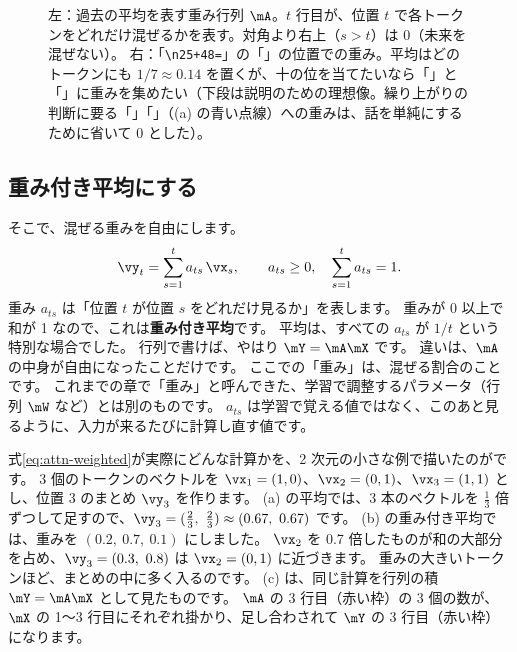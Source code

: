 \begin{figure}[tbp]
\caption{左：過去の平均を表す重み行列 $\mA$。$t$ 行目が、位置 $t$ で各トークンをどれだけ混ぜるかを表す。対角より右上（$s>t$）は 0（未来を混ぜない）。
右：「\texttt{\textbackslash n25+48=}」の「\code{=}」の位置での重み。平均はどのトークンにも $1/7\approx0.14$ を置くが、十の位を当てたいなら「」と「」に重みを集めたい（下段は説明のための理想像。繰り上がりの判断に要る「」「」（(a) の青い点線）への重みは、話を単純にするために省いて 0 とした）。}
\label{fig:attn-avg}
\end{figure}

\subsection*{重み付き平均にする}

そこで、混ぜる重みを自由にします。
\begin{equation}
\vy_t = \sum_{s=1}^{t} a_{ts}\,\vx_s, \qquad a_{ts}\ge 0,\quad \sum_{s=1}^{t} a_{ts} = 1 .
\label{eq:attn-weighted}
\end{equation}
重み $a_{ts}$ は「位置 $t$ が位置 $s$ をどれだけ見るか」を表します。
重みが 0 以上で和が 1 なので、これは\textbf{重み付き平均}です。
平均は、すべての $a_{ts}$ が $1/t$ という特別な場合でした。
行列で書けば、やはり $\mY = \mA\mX$ です。
違いは、$\mA$ の中身が自由になったことだけです。
ここでの「重み」は、混ぜる割合のことです。
これまでの章で「重み」と呼んできた、学習で調整するパラメータ（行列 $\mW$ など）とは別のものです。
$a_{ts}$ は学習で覚える値ではなく、このあと見るように、入力が来るたびに計算し直す値です。

式\eqref{eq:attn-weighted}が実際にどんな計算かを、2 次元の小さな例で描いたのがです。
3 個のトークンのベクトルを $\vx_1=(1,0)$、$\vx_2=(0,1)$、$\vx_3=(1,1)$ とし、位置 3 のまとめ $\vy_3$ を作ります。
(a) の平均では、3 本のベクトルを $\frac13$ 倍ずつして足すので、$\vy_3=(\frac23,\ \frac23)\approx(0.67,\ 0.67)$ です。
(b) の重み付き平均では、重みを $(0.2,\ 0.7,\ 0.1)$ にしました。
$\vx_2$ を 0.7 倍したものが和の大部分を占め、$\vy_3=(0.3,\ 0.8)$ は $\vx_2=(0,1)$ に近づきます。
重みの大きいトークンほど、まとめの中に多く入るのです。
(c) は、同じ計算を行列の積 $\mY=\mA\mX$ として見たものです。
$\mA$ の 3 行目（赤い枠）の 3 個の数が、$\mX$ の 1〜3 行目にそれぞれ掛かり、足し合わされて $\mY$ の 3 行目（赤い枠）になります。

